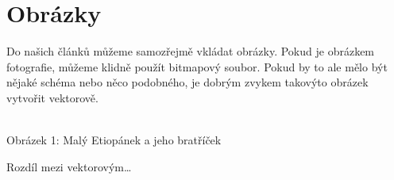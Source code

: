 \documentclass[a4paper,11pt]{article}
\begin{document}
{  \section{Obrázky}
  Do našich článků můžeme samozřejmě vkládat obrázky. Pokud je obrázkem fotografie,
  můžeme klidně použít bitmapový soubor. Pokud by to ale mělo být nějaké schéma nebo
  něco podobného, je dobrým zvykem takovýto obrázek vytvořit vektorově.
\begin{center}
\\\bigskip Obrázek 1: Malý Etiopánek a jeho bratříček
\end{center}

  Rozdíl mezi vektorovým\dots
  \be}
\end{document}
